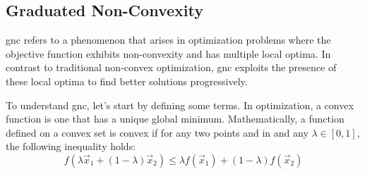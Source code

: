 







\subsection{Graduated Non-Convexity}\label{subs:2-pose-estimation-graduated-non-convexity}

\gls{gnc} refers to a phenomenon that arises in optimization problems where the objective function exhibits non-convexity and has multiple local optima. In contrast to traditional non-convex optimization, \gls{gnc} exploits the presence of these local optima to find better solutions progressively. \medskip

To understand \gls{gnc}, let's start by defining some terms. In optimization, a convex function is one that has a unique global minimum. Mathematically, a function  defined on a convex set  is convex if for any two points  and  in  and any $\lambda \in [0,1]$, the following inequality holds:
\begin{equation}
	f(\lambda \vec{x}_1 + (1-\lambda)\vec{x}_2) \leq \lambda f(\vec{x}_1) + (1-\lambda)f(\vec{x}_2)
\end{equation}

